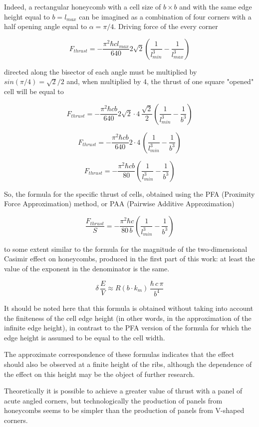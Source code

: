 \documentclass[11pt]{article}
\begin{document}
Indeed, a rectangular honeycomb with a cell size of \(b \times b\) and
with the same edge height equal to \(b = l_{max}\) can be imagined as a
combination of four corners with a half opening angle equal to
\(\alpha = {\pi}/{4}\). Driving force of the every corner

\[F_{thrust} = - \frac{\pi^2\hbar c l_{max}}{640} 2\sqrt{2} \left(\frac{1}{l_{min}^3} - \frac{1}{l_{max}^3}\right)\]

directed along the bisector of each angle must be multiplied by
\(sin\left({\pi}/{4}\right)={\sqrt{2}}\big/{2}\) and, when multiplied by
4, the thrust of one square "opened" cell will be equal to

\[F_{thrust} = - \frac{\pi^2\hbar c b}{640} 2\sqrt{2}\cdot4\,\frac{\sqrt{2}}{2} \left(\frac{1}{l_{min}^3} - \frac{1}{b^3}\right)\]

\[F_{thrust} = - \frac{\pi^2\hbar c b}{640} 2\cdot4\,\left(\frac{1}{l_{min}^3} - \frac{1}{b^3}\right)\]

\[F_{thrust} = - \frac{\pi^2\hbar c b}{80} \left(\frac{1}{l_{min}^3} - \frac{1}{b^3}\right)\]

So, the formula for the specific thrust of cells, obtained using the PFA
(Proximity Force Approximation) method, or PAA (Pairwise Additive
Approximation)

\[\frac{F_{thrust}}{S} = - \frac{\pi^2\hbar c}{80\, b} \left(\frac{1}{l_{min}^3} - \frac{1}{b^3}\right)\]

to some extent similar to the formula for the magnitude of the
two-dimensional Casimir effect on honeycombs, produced in the first part
of this work: at least the value of the exponent in the denominator is
the same.

\[\delta\,\frac{E}{V} \approx R\left(b \cdot k_m\right)\,\frac{\hbar\,c\,\pi}{b^4}\]

It should be noted here that this formula is obtained without taking
into account the finiteness of the cell edge height (in other words, in
the approximation of the infinite edge height), in contrast to the PFA
version of the formula for which the edge height is assumed to be equal
to the cell width.

The approximate correspondence of these formulas indicates that the
effect should also be observed at a finite height of the ribs, although
the dependence of the effect on this height may be the object of further
research.

Theoretically it is possible to achieve a greater value of thrust with a
panel of acute angled corners, but technologically the production of
panels from honeycombs seems to be simpler than the production of panels
from V-shaped corners.
\end{document}
